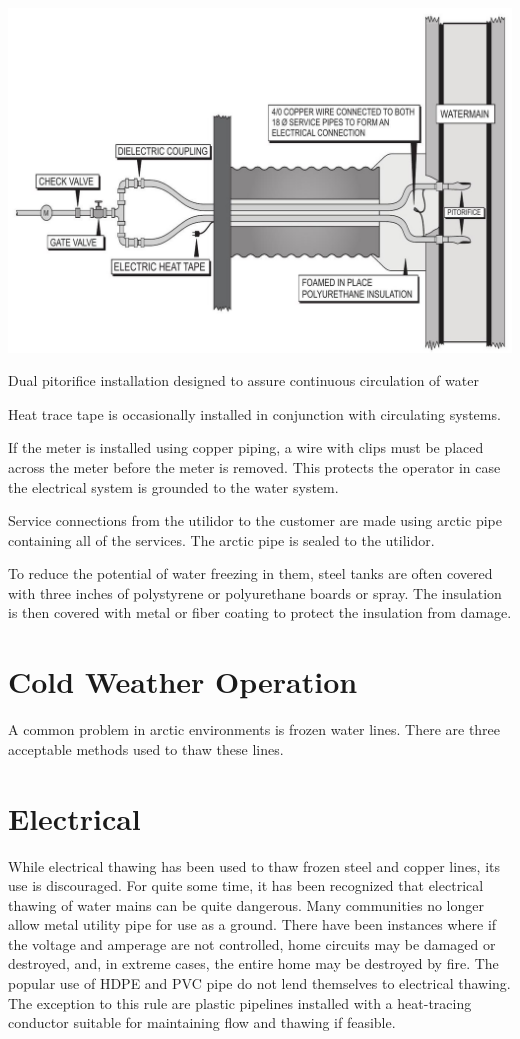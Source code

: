\documentclass[10pt]{article}
\begin{document}
\includegraphics[max width=\textwidth]{2022_11_03_fc0cbc2f3612fab6edd2g-35}

Dual pitorifice installation designed to assure continuous circulation of water

Heat trace tape is occasionally installed in conjunction with circulating systems.

If the meter is installed using copper piping, a wire with clips must be placed across the meter before the meter is removed. This protects the operator in case the electrical system is grounded to the water system.

Service connections from the utilidor to the customer are made using arctic pipe containing all of the services. The arctic pipe is sealed to the utilidor.

To reduce the potential of water freezing in them, steel tanks are often covered with three inches of polystyrene or polyurethane boards or spray. The insulation is then covered with metal or fiber coating to protect the insulation from damage.

\section{Cold Weather Operation}
A common problem in arctic environments is frozen water lines. There are three acceptable methods used to thaw these lines.

\section{Electrical}
While electrical thawing has been used to thaw frozen steel and copper lines, its use is discouraged. For quite some time, it has been recognized that electrical thawing of water mains can be quite dangerous. Many communities no longer allow metal utility pipe for use as a ground. There have been instances where if the voltage and amperage are not controlled, home circuits may be damaged or destroyed, and, in extreme cases, the entire home may be destroyed by fire. The popular use of HDPE and PVC pipe do not lend themselves to electrical thawing. The exception to this rule are plastic pipelines installed with a heat-tracing conductor suitable for maintaining flow and thawing if feasible.
\end{document}
